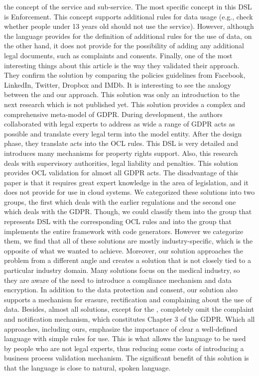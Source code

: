 \documentclass[11pt,english]{article}
\begin{document}
the concept of the service and sub-service. The most specific concept in this DSL is Enforcement. This concept supports additional rules for data usage (e.g., check whether people under 13 years old should not use the service). However, although the language provides for the definition of additional rules for the use of data, on the other hand, it does not provide for the possibility of adding any additional legal documents, such as complaints and consents. Finally, one of the most interesting things about this article is the way they validated their approach. They confirm the solution by comparing the policies guidelines from Facebook, LinkedIn, Twitter, Dropbox and IMDb. \newline It is interesting to see the analogy between the \cite{torre2019using} and our approach. This solution was only an introduction to the next research  \cite{modeldrivengdpr} which is not published yet. This solution provides a complex and comprehensive meta-model of GDPR. During development, the authors collaborated with legal experts to address as wide a range of GDPR acts as possible and translate every legal term into the model entity. After the design phase, they translate acts into the OCL rules. This DSL is very detailed and introduces many mechanisms for property rights support. Also, this research deals with supervisory authorities, legal liability and penalties. This solution provides OCL validation for almost all GDPR acts. The disadvantage of this paper is that it requires great expert knowledge in the area of legislation, and it does not provide for use in cloud systems. \newline We categorized these solutions into two groups, the first which deals with the earlier regulations and the second one which deals with the GDPR. Though, we could classify them into the group that represents DSL with the corresponding OCL rules and into the group that implements the entire framework with code generators. However we categorize them, we find that all of these solutions are mostly industry-specific, which is the opposite of what we wanted to achieve. Moreover, our solution approaches the problem from a different angle and creates a solution that is not closely tied to a particular industry domain. Many solutions focus on the medical industry, so they are aware of the need to introduce a compliance mechanism and data encryption. In addition to the data protection and consent, our solution also supports a mechanism for erasure, rectification and complaining about the use of data. Besides, almost all solutions, except for the \cite{torre2019using}, completely omit the complaint and notification mechanism, which constitutes Chapter 3 of the GDPR.  Which all approaches, including ours, emphasize the importance of clear a well-defined language with simple rules for use. This is what allows the language to be used by people who are not legal experts, thus reducing some costs of introducing a business process validation mechanism. The significant benefit of this solution is that the language is close to natural, spoken language.
\end{document}
